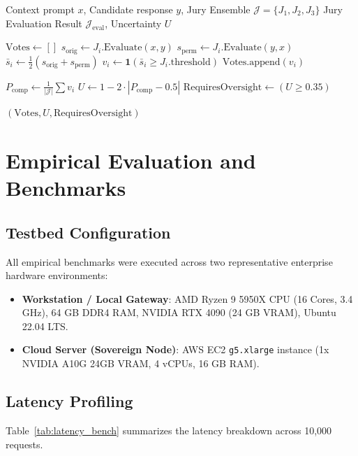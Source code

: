 \documentclass[11pt,a4paper]{article}
\theoremstyle{definition}
\begin{document}
\begin{algorithm}[h]
\caption{Multi-SLM Jury Epistemic Consensus Evaluation}
\label{alg:jury_eval}
\begin{algorithmic}[1]
\REQUIRE Context prompt $x$, Candidate response $y$, Jury Ensemble $\mathcal{J} = \{J_1, J_2, J_3\}$
\ENSURE Jury Evaluation Result $\mathcal{J}_{\text{eval}}$, Uncertainty $U$

\STATE $\text{Votes} \gets []$
    \STATE $s_{\text{orig}} \gets J_i.\text{Evaluate}(x, y)$
    \STATE $s_{\text{perm}} \gets J_i.\text{Evaluate}(y, x)$ 
    \STATE $\bar{s}_i \gets \frac{1}{2}(s_{\text{orig}} + s_{\text{perm}})$
    \STATE $v_i \gets \mathbf{1}(\bar{s}_i \ge J_i.\text{threshold})$
    \STATE $\text{Votes}.\text{append}(v_i)$
\ENDFOR

\STATE $P_{\text{comp}} \gets \frac{1}{|\mathcal{J}|} \sum v_i$
\STATE $U \gets 1 - 2 \cdot |P_{\text{comp}} - 0.5|$
\STATE $\text{RequiresOversight} \gets (U \ge 0.35)$

\RETURN $(\text{Votes}, U, \text{RequiresOversight})$
\end{algorithmic}
\end{algorithm}


\section{Empirical Evaluation and Benchmarks}
\label{sec:benchmarks}

\subsection{Testbed Configuration}
All empirical benchmarks were executed across two representative enterprise hardware environments:
\begin{itemize}
    \item \textbf{Workstation / Local Gateway}: AMD Ryzen 9 5950X CPU (16 Cores, 3.4 GHz), 64 GB DDR4 RAM, NVIDIA RTX 4090 (24 GB VRAM), Ubuntu 22.04 LTS.
    \item \textbf{Cloud Server (Sovereign Node)}: AWS EC2 \texttt{g5.xlarge} instance (1x NVIDIA A10G 24GB VRAM, 4 vCPUs, 16 GB RAM).
\end{itemize}

\subsection{Latency Profiling}
Table~\ref{tab:latency_bench} summarizes the latency breakdown across 10,000 requests.
\end{document}
